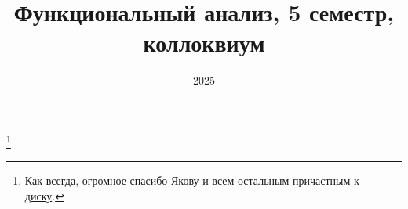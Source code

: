 \documentclass[a4paper]{article}
\title{Функциональный анализ, 5 семестр, коллоквиум}
\author{}
\date{2025}
\begin{document}
    \tableofcontents
	\maketitle
	\thanks{Как всегда, огромное спасибо Якову и всем остальным причастным к
	\href{https://drive.google.com/drive/folders/16uwXjUdkJWUURIGfkmW7klQNvkZQw-za}{диску}.}

    
	
\end{document}
